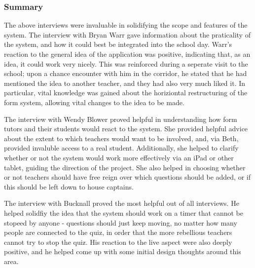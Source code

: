\subsubsection{Summary}
The above interviews were invaluable in solidifying the scope and features of the system. The interview with Bryan Warr gave information about the praticality of the system, and how it could best be integrated into the school day. Warr's reaction to the general idea of the application was positive, indicating that, as an idea, it could work very nicely. This was reinforced during a seperate visit to the school; upon a chance encounter with him in the corridor, he stated that he had mentioned the idea to another teacher, and they had also very much liked it. In particular, vital knowledge was gained about the horiziontal restructuring of the form system, allowing vital changes to the idea to be made.

The interview with Wendy Blower proved helpful in understanding how form tutors and their students would react to the system. She provided helpful advice about the extent to which teachers would want to be involved, and, via Beth, provided invaluble access to a real student. Additionally, she helped to clarify whether or not the system would work more effectively via an iPad or other tablet, guiding the direction of the project. She also helped in choosing whether or not teachers should have free reign over which questions should be added, or if this should be left down to house captains.

The interview with Bucknall proved the most helpful out of all interviews. He helped solidfiy the idea that the system should work on a timer that cannot be stopeed by anyone - questions should just keep moving, no matter how many people are connected to the quiz, in order that the more rebellious teachers cannot try to stop the quiz. His reaction to the live aspect were also deeply positive, and he helped come up with some initial design thoughts around this area.
